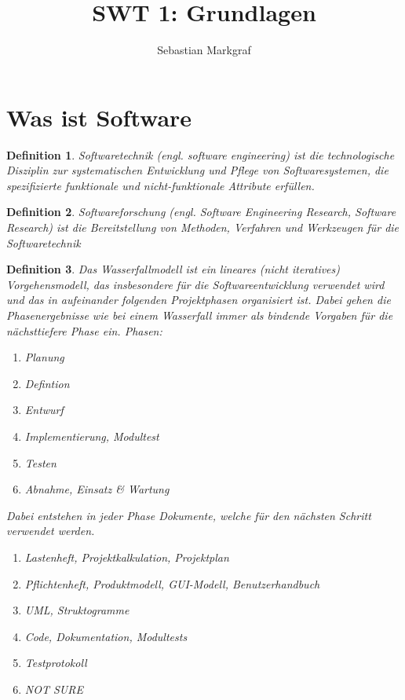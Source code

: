 \documentclass[a4paper]{article}
\title{SWT 1: Grundlagen}
\author{Sebastian Markgraf}
\theoremstyle{break}
\newtheorem{defi}{Definition}[section]
\begin{document}
\maketitle
\section {Was ist Software}
\begin {defi}
  Softwaretechnik (engl. software engineering) ist die technologische Disziplin zur systematischen Entwicklung und Pflege von Softwaresystemen, die spezifizierte funktionale und nicht-funktionale Attribute erfüllen.
\end {defi}

\begin {defi}
  Softwareforschung (engl. Software Engineering Research, Software Research) ist die Bereitstellung von Methoden, Verfahren und Werkzeugen für die Softwaretechnik
\end {defi}


\begin {defi}
  Das Wasserfallmodell ist ein lineares (nicht iteratives) Vorgehensmodell, das insbesondere für die Softwareentwicklung verwendet wird und das in aufeinander folgenden Projektphasen organisiert ist. Dabei gehen die Phasenergebnisse wie bei einem Wasserfall immer als bindende Vorgaben für die nächsttiefere Phase ein.
  Phasen:
  \begin {enumerate}
  \item Planung
  \item Defintion
  \item Entwurf
  \item Implementierung, Modultest
  \item Testen
  \item Abnahme, Einsatz \& Wartung
  \end {enumerate}
  Dabei entstehen in jeder Phase Dokumente, welche für den nächsten Schritt verwendet werden.
  \begin {enumerate}
  \item Lastenheft, Projektkalkulation, Projektplan
  \item Pflichtenheft, Produktmodell, GUI-Modell, Benutzerhandbuch
  \item UML, Struktogramme
  \item Code, Dokumentation, Modultests
  \item Testprotokoll
  \item NOT SURE 
    \end {enumerate}
\end {defi}
\end{document}
